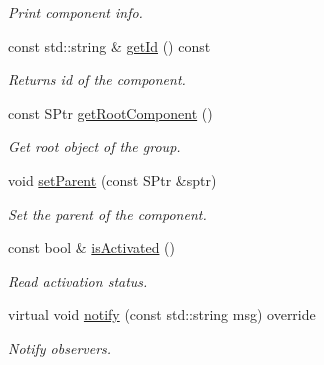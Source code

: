 \begin{DoxyCompactItemize}
\begin{DoxyCompactList}\small\item\em Print component info. \end{DoxyCompactList}\item 
const std\+::string \& \hyperlink{classAlarmComponent_a7d576b833767677aef88ac0e53dc5f22}{get\+Id} () const \hypertarget{classAlarmComponent_a7d576b833767677aef88ac0e53dc5f22}{}\label{classAlarmComponent_a7d576b833767677aef88ac0e53dc5f22}

\begin{DoxyCompactList}\small\item\em Returns id of the component. \end{DoxyCompactList}\item 
const S\+Ptr \hyperlink{classAlarmComponent_ab105241dfaade407b9683bb32e8d0f2f}{get\+Root\+Component} ()
\begin{DoxyCompactList}\small\item\em Get root object of the group. \end{DoxyCompactList}\item 
void \hyperlink{classAlarmComponent_a8a23397273077d5808735d083878378a}{set\+Parent} (const S\+Ptr \&sptr)
\begin{DoxyCompactList}\small\item\em Set the parent of the component. \end{DoxyCompactList}\item 
const bool \& \hyperlink{classAlarmComponent_ad445ad4870607e5305ef6e7eee10eb3b}{is\+Activated} ()\hypertarget{classAlarmComponent_ad445ad4870607e5305ef6e7eee10eb3b}{}\label{classAlarmComponent_ad445ad4870607e5305ef6e7eee10eb3b}

\begin{DoxyCompactList}\small\item\em Read activation status. \end{DoxyCompactList}\item 
virtual void \hyperlink{classAlarmComponent_ae94d389ca9933e31e2bda486eb5b7c1f}{notify} (const std\+::string msg) override
\begin{DoxyCompactList}\small\item\em Notify observers. \end{DoxyCompactList}\end{DoxyCompactItemize}
